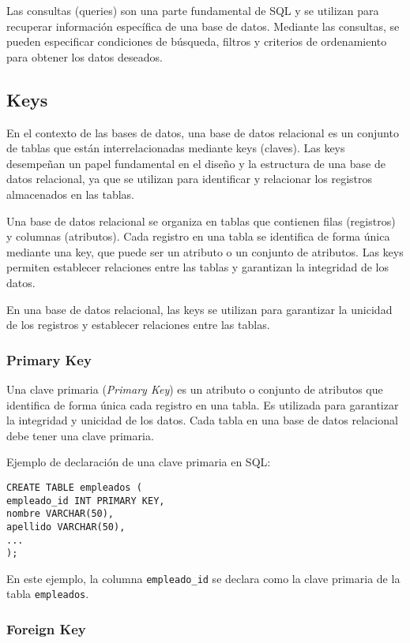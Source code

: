 \documentclass[executivepaper]{article}
\begin{document}
Las consultas (queries) son una parte fundamental de SQL y se utilizan para recuperar información específica de una base de datos. Mediante las consultas, se pueden especificar condiciones de búsqueda, filtros y criterios de ordenamiento para obtener los datos deseados.

\subsection{Keys}

En el contexto de las bases de datos, una base de datos relacional es un conjunto de tablas que están interrelacionadas mediante keys (claves). Las keys desempeñan un papel fundamental en el diseño y la estructura de una base de datos relacional, ya que se utilizan para identificar y relacionar los registros almacenados en las tablas.

Una base de datos relacional se organiza en tablas que contienen filas (registros) y columnas (atributos). Cada registro en una tabla se identifica de forma única mediante una key, que puede ser un atributo o un conjunto de atributos. Las keys permiten establecer relaciones entre las tablas y garantizan la integridad de los datos.

En una base de datos relacional, las keys se utilizan para garantizar la unicidad de los registros y establecer relaciones entre las tablas.

\subsubsection*{Primary Key}

Una clave primaria (\textit{Primary Key}) es un atributo o conjunto de atributos que identifica de forma única cada registro en una tabla. Es utilizada para garantizar la integridad y unicidad de los datos. Cada tabla en una base de datos relacional debe tener una clave primaria.

Ejemplo de declaración de una clave primaria en SQL:

\begin{lstlisting}
CREATE TABLE empleados (
empleado_id INT PRIMARY KEY,
nombre VARCHAR(50),
apellido VARCHAR(50),
...
);
\end{lstlisting}

En este ejemplo, la columna \texttt{empleado\_id} se declara como la clave primaria de la tabla \texttt{empleados}.

\subsubsection*{Foreign Key}
\end{document}
